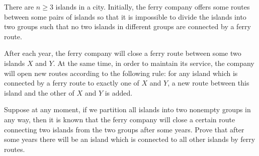 There are $n \geq 3$ islands in a city. Initially, the ferry company offers some routes between some pairs of islands so that it is impossible to divide the islands into two groups such that no two islands in different groups are connected by a ferry route.

After each year, the ferry company will close a ferry route between some two islands $X$ and $Y$. At the same time, in order to maintain its service, the company will open new routes according to the following rule: for any island which is connected by a ferry route to exactly one of $X$ and $Y$, a new route between this island and the other of $X$ and $Y$ is added.

Suppose at any moment, if we partition all islands into two nonempty groups in any way, then it is known that the ferry company will close a certain route connecting two islands from the two groups after some years. Prove that after some years there will be an island which is connected to all other islands by ferry routes.
